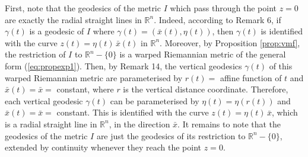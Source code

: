 \documentclass{svmult}
\begin{document}
First, note that the geodesics of the metric $I$ which pass through the point $z = 0$ are exactly the radial straight lines in $\mathbb{R}^n$. Indeed, according to Remark 6, if $\gamma(t)$ is a geodesic of $I$ where $\gamma(t) = (\bar{x}(t),\eta(t))$, then $\gamma(t)$ is identified with the curve $z(t) = \eta(t)\,\bar{x}(t)$ in $\mathbb{R}^n$. Moreover, by Proposition \ref{prop:vmf}, the restriction of $I$ to $\mathbb{R}^n - \lbrace 0 \rbrace$ is a warped Riemannian metric of the general form (\ref{eq:propexp1}). Then, by Remark 14, the vertical geodesics $\gamma(t)$ of this warped Riemannian metric are parameterised by $r(t) =$ affine function of $t$ and $\bar{x}(t) = \bar{x} =$ constant, where $r$ is the vertical distance coordinate. Therefore, each vertical geodesic $\gamma(t)$ can be parameterised by $\eta(t) = \eta(r(t))$ and $\bar{x}(t) = \bar{x} =$ constant. This is identified with the curve $z(t) = \eta(t)\,\bar{x}$, which is a radial straight line in $\mathbb{R}^n$, in the direction $\bar{x}$. It remains to note that the geodesics of the metric $I$ are just the geodesics of its restriction to $\mathbb{R}^n - \lbrace 0 \rbrace$, extended by continuity whenever they reach the point $z = 0$. 
\end{document}
